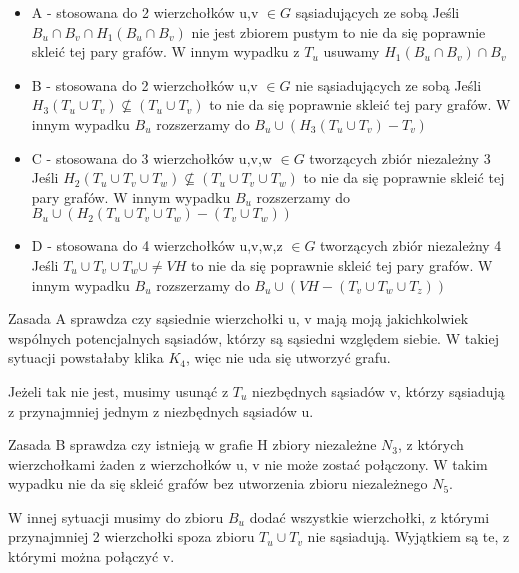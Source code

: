 \documentclass[11pt]{article}
\begin{document}
\begin{itemize}
  \item   A - stosowana do 2 wierzchołków u,v $\in G$ sąsiadujących ze sobą \linebreak
  Jeśli $B_u \cap B_v \cap H_1(B_u \cap B_v)$ nie jest zbiorem pustym to nie da się 
  poprawnie skleić tej pary grafów. \linebreak
  W innym wypadku z $T_u$ usuwamy $H_1(B_u \cap B_v) \cap B_v $  
  \item   B - stosowana do 2 wierzchołków u,v $\in G$ nie sąsiadujących ze sobą \linebreak
  Jeśli $H_3(T_u \cup T_v) \not\subseteq (T_u \cup T_v)$ to nie da się poprawnie skleić tej 
  pary grafów. \linebreak
  W innym wypadku $B_u$ rozszerzamy do $B_u \cup (H_3(T_u \cup T_v) - T_v)$
  \item   C - stosowana do 3 wierzchołków u,v,w $\in G$ tworzących zbiór niezależny 3 \linebreak
  Jeśli $H_2(T_u \cup T_v \cup T_w) \not\subseteq (T_u \cup T_v \cup T_w)$ 
  to nie da się poprawnie skleić tej pary grafów. \linebreak
  W innym wypadku $B_u$ rozszerzamy do $B_u \cup (H_2(T_u \cup T_v \cup T_w) - (T_v \cup T_w))$
  \item   D - stosowana do 4 wierzchołków u,v,w,z $\in G$ tworzących zbiór niezależny 4 \linebreak
  Jeśli $T_u \cup T_v \cup T_w \cup \neq VH $ to nie da się poprawnie skleić tej pary grafów.
  W innym wypadku $B_u$ rozszerzamy do $B_u \cup (VH - (T_v \cup T_w \cup T_z))$
\end{itemize}

Zasada A sprawdza czy sąsiednie wierzchołki u, v mają moją jakichkolwiek wspólnych potencjalnych sąsiadów, którzy są sąsiedni względem siebie.
W takiej sytuacji powstałaby klika $K_4$, więc nie uda się utworzyć grafu. 

Jeżeli tak nie jest, musimy usunąć z $T_u$ niezbędnych sąsiadów v, 
którzy sąsiadują z przynajmniej jednym z niezbędnych sąsiadów u. \linebreak

Zasada B sprawdza czy istnieją w grafie H zbiory niezależne $N_3$, z których wierzchołkami żaden z wierzchołków u, v 
nie może zostać połączony. W takim wypadku nie da się skleić grafów bez utworzenia zbioru niezależnego $N_5$. 

W innej sytuacji musimy do zbioru $B_u$ dodać wszystkie wierzchołki, 
z którymi przynajmniej 2 wierzchołki spoza zbioru $T_u \cup T_v$ nie sąsiadują. Wyjątkiem są te, z którymi można połączyć v.  \linebreak 
\end{document}
